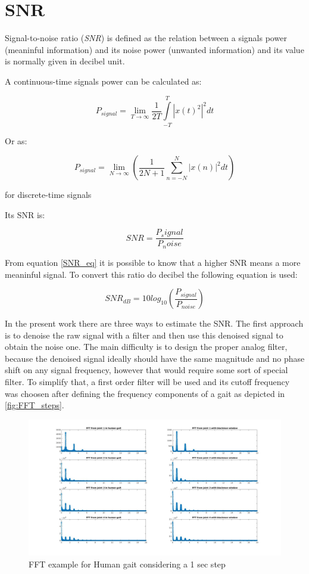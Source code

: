 \chapter{SNR}

Signal-to-noise ratio (\textit{SNR}) is defined as the relation between a signals power (meaninful information) and its noise power (unwanted information) and its value is normally given in decibel unit.

A continuous-time signals power can be calculated as: 

 \begin{equation}
    P_{signal} = \lim_{T\to\infty} \frac{1}{2T} \int\limits_{-T}^{T} \left |x(t)^2  \right |^2 dt
    \label{Power_eq_cont}
 \end{equation}

Or as:

 \begin{equation}
    P_{signal} = \lim_{N\to\infty} \left ( \frac{1}{2N+1} \sum\limits_{n=-N}^{N} \left |x(n)   \right |^2 dt \right ) 
    \label{Power_eq_disc}
 \end{equation}

for discrete-time signals

Its SNR is:

 \begin{equation}
     SNR = \frac{P_signal}{P_noise}
     \label{SNR_eq}
 \end{equation}

From equation \eqref{SNR_eq} it is possible to know that a higher SNR means a more meaninful signal. To convert this ratio do decibel the following equation is used:

\begin{equation}
    SNR_{dB} = 10log_{10} \left( \frac{P_{signal}}{P_{noise}} \right)
\end{equation}

In the present work there are three ways to estimate the SNR. The first approach is to denoise the raw signal with a filter and then use this denoised signal to obtain the noise one. The main difficulty is to design the proper analog filter, because the denoised signal ideally should have the same magnitude and no phase shift on any signal frequency, however that would require some sort of special filter. To simplify that, a first order filter will be used and its cutoff frequency was choosen after defining the frequency components of a gait as depicted in \ref{fig:FFT_steps}.

\begin{figure}[h]
    \centering
    \includegraphics[width=\linewidth]{1sec_step_FFT.jpg}
    \caption{FFT example for Human gait considering a 1 sec step}
    \label{fig:FFT_step}
\end{figure}

